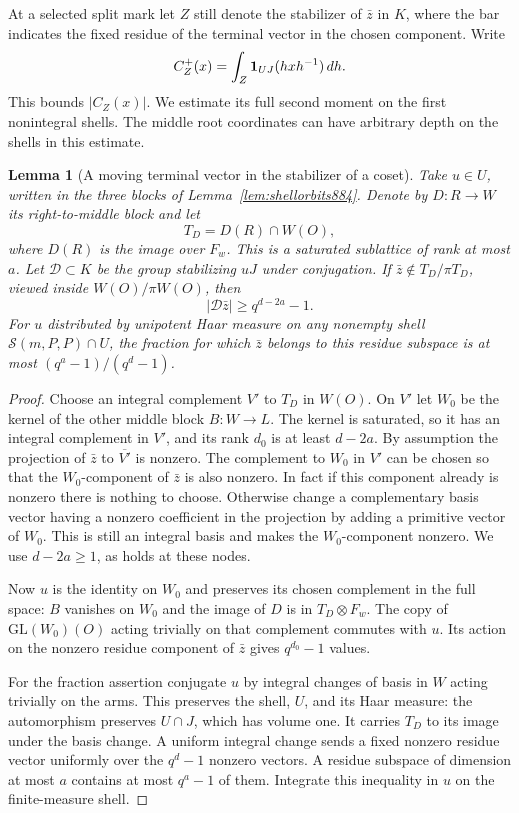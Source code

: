 \documentclass[a4paper,11pt]{article}
\newtheorem{lemma}[proposition]{Lemma}
\theoremstyle{definition}
\theoremstyle{remark}
\numberwithin{equation}{section}
\begin{document}
At a selected split mark let \(Z\) still denote the stabilizer
of \(\bar z\) in \(K\), where the bar indicates the fixed residue
of the terminal vector in the chosen component. Write
\[
  C_Z^+(x)=\int_Z {\bf1}_{UJ}(hxh^{-1})\,dh .
\]
This bounds \(|C_Z(x)|\). We estimate its full second moment on
the first nonintegral shells. The middle root coordinates can
have arbitrary depth on the shells in this estimate.

\begin{lemma}[A moving terminal vector in the stabilizer of a coset]
\leavevmode\label{lem:terminalorbit886}
Take \(u\in U\), written in the three blocks of
Lemma~\ref{lem:shellorbits884}. Denote by \(D:R\to W\) its
right-to-middle block and let
\[
  T_D=D(R)\cap W(O),
\]
where \(D(R)\) is the image over \(F_w\). This is a saturated
sublattice of rank at most \(a\). Let \(\mathcal D\subset K\)
be the group stabilizing \(uJ\) under conjugation. If
\(\bar z\notin T_D/\pi T_D\), viewed inside \(W(O)/\pi W(O)\),
then
\[
                  |\mathcal D\bar z|\ge q^{d-2a}-1 .
\]
For \(u\) distributed by unipotent Haar measure on any nonempty
shell \(\mathcal S(m,P,P)\cap U\), the fraction for which
\(\bar z\) belongs to this residue subspace is at most
\((q^a-1)/(q^d-1)\).
\end{lemma}
\begin{proof}
Choose an integral complement \(V'\) to \(T_D\) in \(W(O)\).
On \(V'\) let \(W_0\) be the kernel of the other middle block
\(B:W\to L\). The kernel is saturated, so it has an integral
complement in \(V'\), and its rank \(d_0\) is at least \(d-2a\).
By assumption the projection of \(\bar z\) to \(\overline{V'}\)
is nonzero. The complement to \(W_0\) in \(V'\) can be chosen
so that the \(W_0\)-component of \(\bar z\) is also nonzero.
In fact if this component already is nonzero there is nothing
to choose. Otherwise change a complementary basis vector having
a nonzero coefficient in the projection by adding a primitive
vector of \(W_0\). This is still an integral basis and makes
the \(W_0\)-component nonzero. We use \(d-2a\ge1\), as holds
at these nodes.

Now \(u\) is the identity on \(W_0\) and preserves its chosen
complement in the full space: \(B\) vanishes on \(W_0\) and
the image of \(D\) is in \(T_D\otimes F_w\). The copy of
\(\mathrm{GL}(W_0)(O)\) acting trivially on that complement
commutes with \(u\). Its action on the nonzero residue component
of \(\bar z\) gives \(q^{d_0}-1\) values.

For the fraction assertion conjugate \(u\) by integral changes
of basis in \(W\) acting trivially on the arms. This preserves
the shell, \(U\), and its Haar measure: the automorphism preserves
\(U\cap J\), which has volume one. It carries \(T_D\) to its
image under the basis change. A uniform integral change sends a
fixed nonzero residue vector uniformly over the \(q^d-1\)
nonzero vectors. A residue subspace of dimension at most \(a\)
contains at most \(q^a-1\) of them. Integrate this inequality
in \(u\) on the finite-measure shell.
\end{proof}
\end{document}
